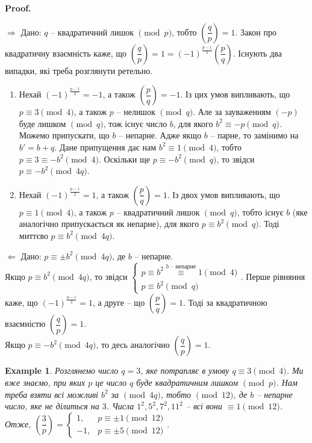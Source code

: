 \documentclass[a4paper, 10pt]{article}
\makeatletter
\theoremstyle{theoremdd}
\theoremstyle{theoremdd}
\theoremstyle{theoremdd}
\theoremstyle{theoremdd}
\newtheorem{example}[theorem]{Example}
\theoremstyle{theoremdd}
\theoremstyle{theoremdd}
\theoremstyle{theoremdd}
\theoremstyle{theoremdd}
\def\rightproof{$\boxed{\Rightarrow}$ }
\def\leftproof{$\boxed{\Leftarrow}$ }
\renewenvironment{proof}[1][Proof.\\]{\par
\pushQED{\hfill \qed}%
\normalfont \topsep6\p@\@plus6\p@\relax
\trivlist
\item\relax
{\bfseries
#1\@addpunct{.}}\hspace\labelsep\ignorespaces
}{%
\popQED\endtrivlist\@endpefalse
}
\makeatother
\begin{document}
\begin{proof}
\rightproof Дано: $q$ -- квадратичний лишок $\!\! \pmod p$, тобто $\left( \dfrac{q}{p} \right) = 1$. Закон про квадратичну взаємність каже, що $\left( \dfrac{q}{p} \right) = 1 = (-1)^{\frac{p-1}{2}} \left( \dfrac{p}{q} \right)$. Існують два випадки, які треба розглянути ретельно.
\begin{enumerate}[nosep,wide=0pt,label={\arabic*)}]
\item Нехай $(-1)^{\frac{p-1}{2}} = -1$, а також $\left( \dfrac{p}{q} \right) = -1$. Із цих умов випливають, що $p \equiv 3 \pmod 4$, а також $p$ -- нелишок $\!\! \pmod q$. Але за зауваженням $(-p)$ буде лишком $\!\! \pmod q$, тож існує число $b$, для якого $b^2 \equiv -p \pmod q$. Можемо припускати, що $b$ -- непарне. Адже якщо $b$ -- парне, то замінимо на $b' = b+q$. Дане припущення дає нам $b^2 \equiv 1 \pmod 4$, тобто $p \equiv 3 \equiv -b^2 \pmod 4$. Оскільки ще $p \equiv -b^2 \pmod q$, то звідси $p \equiv -b^2 \pmod {4q}$.

\item Нехай $(-1)^{\frac{p-1}{2}} = 1$, а також $\left( \dfrac{p}{q} \right) = 1$. Із двох умов випливають, що $p \equiv 1 \pmod 4$, а також $p$ -- квадратичний лишок $\!\! \pmod q$, тобто існує $b$ (яке аналогічно припускається як непарне), для якого $p \equiv b^2 \pmod q$. Тоді миттєво $p \equiv b^2 \pmod {4q}$. 
\end{enumerate}

\leftproof Дано: $p \equiv \pm b^2 \pmod {4q}$, де $b$ -- непарне.\\
Якщо $p \equiv b^2 \pmod {4q}$, то звідси $\begin{cases} p \equiv b^2 \overset{b \text{ -- непарне}}{\equiv} 1 \pmod 4 \\ p \equiv b^2 \pmod q \end{cases}$. Перше рівняння каже, що $(-1)^{\frac{p-1}{2}} = 1$, а друге -- що $\left( \dfrac{p}{q} \right) = 1$. Тоді за квадратичною взаємністю $\left( \dfrac{q}{p} \right) = 1$.\\
Якщо $p \equiv -b^2 \pmod {4q}$, то десь аналогічно $\left( \dfrac{q}{p} \right) = 1$.
\end{proof}

\begin{example}
Розглянемо число $q = 3$, яке потрапляє в умову $q \equiv 3 \pmod 4$. Ми вже знаємо, при яких $p$ це число $q$ буде квадратичним лишком $\!\! \pmod p$. Нам треба взяти всі можливі $b^2$ за $\!\! \pmod {4q}$, тобто $\!\! \pmod {12}$, де $b$ -- непарне число, яке не ділиться на $3$. Числа $1^2,5^2,7^2,11^2$ -- всі вони $\equiv 1 \pmod {12}$.
\bigskip \\
Отже, $\left( \dfrac{3}{p} \right) = \begin{cases} 1, & p \equiv \pm 1 \pmod {12} \\ -1, & p \equiv \pm 5 \pmod {12} \end{cases}$.
\end{example}
\end{document}
